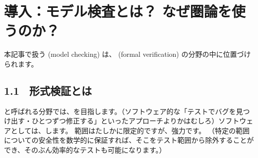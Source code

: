 \documentclass[
		head_space=20mm,
		foot_space=20mm,
		gutter=10mm,
		line_length=190mm
]{jlreq}
\begin{document}

\clearpage

\section{導入：モデル検査とは？ なぜ圏論を使うのか？}
\label{sec:intro}

\noindent 本記事で扱う (model checking) は、 (formal verification) の分野の中に位置づけられます。

\subsection*{1.1~ 形式検証とは}

\noindent 
{}と呼ばれる分野では、を目指します。（ソフトウェア的な「テストでバグを見つけ出す・ひとつずつ修正する」といったアプローチよりかはむしろ）ソフトウェアとしては、します。%
範囲はたしかに限定的ですが、強力です。
（特定の範囲についての安全性を数学的に保証すれば、そこをテスト範囲から除外することができ、そのぶん効率的なテストも可能になります。）
\vspace{4pt}
\end{document}
